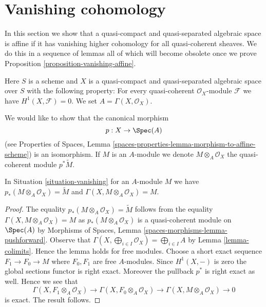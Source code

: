 \section{Vanishing cohomology}
\label{section-vanishing}

\noindent
In this section we show that a quasi-compact and quasi-separated
algebraic space is affine if it has vanishing higher cohomology
for all quasi-coherent sheaves. We do this in a sequence of lemmas
all of which will become obsolete once we prove
Proposition \ref{proposition-vanishing-affine}.

\begin{situation}
\label{situation-vanishing}
Here $S$ is a scheme and $X$ is a quasi-compact and quasi-separated
algebraic space over $S$ with the following property: For every
quasi-coherent $\mathcal{O}_X$-module $\mathcal{F}$ we have
$H^1(X, \mathcal{F}) = 0$. We set $A = \Gamma(X, \mathcal{O}_X)$.
\end{situation}

\noindent
We would like to show that the canonical morphism
$$
p : X \to \Spec(A)
$$
(see Properties of Spaces, Lemma
\ref{spaces-properties-lemma-morphism-to-affine-scheme}) is an isomorphism.
If $M$ is an $A$-module we denote $M \otimes_A \mathcal{O}_X$
the quasi-coherent module $p^*\tilde M$.

\begin{lemma}
\label{lemma-vanishing-compute}
In Situation \ref{situation-vanishing} for an $A$-module $M$ we have
$p_*(M \otimes_A \mathcal{O}_X) = \widetilde{M}$ and
$\Gamma(X, M \otimes_A \mathcal{O}_X) = M$.
\end{lemma}

\begin{proof}
The equality $p_*(M \otimes_A \mathcal{O}_X) = \widetilde{M}$ follows
from the equality $\Gamma(X, M \otimes_A \mathcal{O}_X) = M$ as
$p_*(M \otimes_A \mathcal{O}_X)$ is a quasi-coherent module on
$\Spec(A)$ by Morphisms of Spaces, Lemma
\ref{spaces-morphisms-lemma-pushforward}.
Observe that $\Gamma(X, \bigoplus_{i \in I} \mathcal{O}_X) =
\bigoplus_{i \in I} A$ by Lemma \ref{lemma-colimits}. Hence the
lemma holds for free modules. Choose a short exact sequence
$F_1 \to F_0 \to M$ where $F_0, F_1$ are free $A$-modules. Since
$H^1(X, -)$ is zero the global sections functor is right exact.
Moreover the pullback $p^*$ is right exact as well. Hence we see
that
$$
\Gamma(X, F_1 \otimes_A \mathcal{O}_X) \to
\Gamma(X, F_0 \otimes_A \mathcal{O}_X) \to
\Gamma(X, M \otimes_A \mathcal{O}_X) \to 0
$$
is exact. The result follows.
\end{proof}


